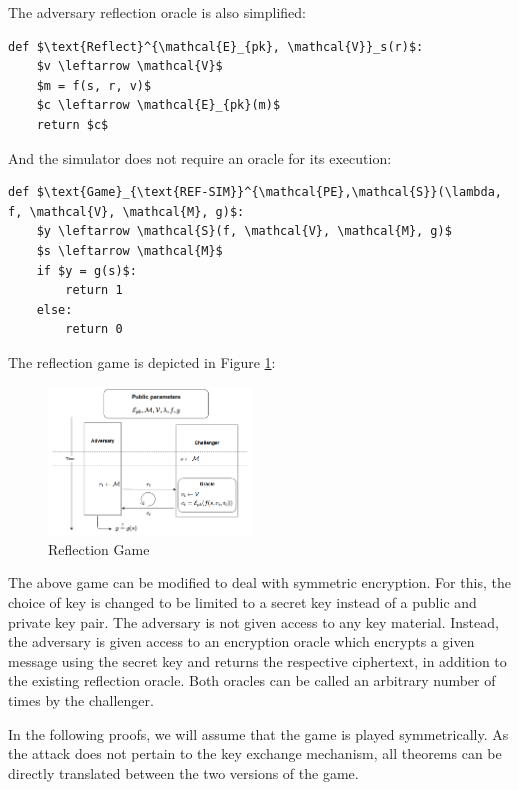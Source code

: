 \documentclass[conference, letterpaper, 10pt]{IEEEtran}
\begin{document}
The adversary reflection oracle is also simplified:

\begin{lstlisting}[texcl,mathescape,basicstyle=\small]
def $\text{Reflect}^{\mathcal{E}_{pk}, \mathcal{V}}_s(r)$:
    $v \leftarrow \mathcal{V}$
    $m = f(s, r, v)$
    $c \leftarrow \mathcal{E}_{pk}(m)$
    return $c$
\end{lstlisting}

And the simulator does not require an oracle for its execution:

\begin{lstlisting}[texcl,mathescape,basicstyle=\small]
def $\text{Game}_{\text{REF-SIM}}^{\mathcal{PE},\mathcal{S}}(\lambda, f, \mathcal{V}, \mathcal{M}, g)$:
    $y \leftarrow \mathcal{S}(f, \mathcal{V}, \mathcal{M}, g)$
    $s \leftarrow \mathcal{M}$
    if $y = g(s)$:
        return 1
    else:
        return 0
\end{lstlisting}

The reflection game is depicted in Figure \ref{fig:refgame}:

    \begin{figure}[thpb]
        \centering
            \includegraphics[width=0.48\textwidth]{reflection_game.png}
        \caption{Reflection Game}
        \label{fig:refgame}
    \end{figure}

 The above game can be modified to deal
with symmetric encryption. For this, the choice of key is changed to be limited
to a secret key instead of a public and private key pair. The adversary is not
given access to any key material.  Instead, the adversary is given access to an
encryption oracle which encrypts a given message using the secret key and
returns the respective ciphertext, in addition to the existing reflection
oracle. Both oracles can be called an arbitrary number of times by the
challenger.

In the following proofs, we will assume that the game is played symmetrically.
As the attack does not pertain to the key exchange mechanism, all theorems can
be directly translated between the two versions of the game.
\end{document}
